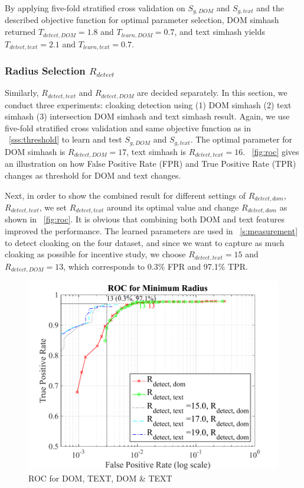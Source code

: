By applying five-fold stratified cross validation on $S_{g, DOM}$ and $S_{g, text}$ and the described
objective function for optimal parameter selection, DOM simhash returned 
$T_{detect, DOM} = 1.8$ and $T_{learn, DOM} = 0.7$, and text simhash yields
$T_{detect, text} = 2.1$ and $T_{learn, text} = 0.7$.
%

\subsubsection{Radius Selection $R_{detect}$}
Similarly, $R_{detect, text}$ and $R_{detect, DOM}$ are decided separately. In this section, we conduct
three experiments: cloaking detection using (1) DOM simhash (2) text simhash (3)
intersection DOM simhash and text simhash result.
Again, we use five-fold stratified cross validation and same objective function as in
~\autoref{sss:threshold} to learn and test $S_{g, DOM}$ and
$S_{g, text}$. The
optimal parameter for DOM simhash is $R_{detect, DOM} = 17$, text simhash is
$R_{detect, text} = 16$. ~\autoref{fig:roc} gives an illustration on
how False Positive Rate (FPR) and True Positive Rate (TPR) changes as
threshold for DOM and text changes. 

Next, in order to show the combined result for different settings of $R_{detect,
dom}$, $R_{detect, text}$, we set $R_{detect, text}$ around its optimal value
and change $R_{detect, dom}$ as shown in ~\autoref{fig:roc}. It is obvious that
combining both DOM and text features improved the performance. 
The learned parameters are used in ~\autoref{s:measurement} to detect cloaking
on the four dataset, and since we want to capture as much cloaking as possible
for incentive study, we choose $R_{detect, text} = 15$ and $R_{detect, DOM} =
13$, which corresponds to 0.3\% FPR and 97.1\% TPR.

\begin{figure}[t]
  \centering
  \includegraphics[width=.5\textwidth]{fig/roc}
  \caption{ROC for DOM, TEXT, DOM \& TEXT}
  \label{fig:roc}
\end{figure}

